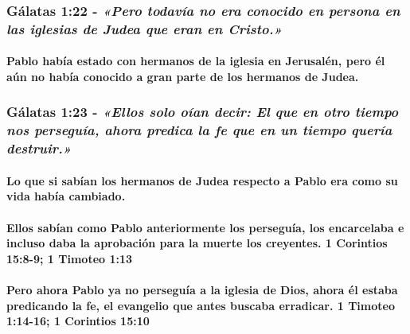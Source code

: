 \documentclass[11a pt,twoside]{article}
\newcommand{\scripture}[1]{%
  {\fontsize{12pt}{16pt}\selectfont\ScriptureFont\itshape #1}%
}
\let\oldsubsubsection\subsubsection
\renewcommand{\subsubsection}{\needspace{4\baselineskip}\oldsubsubsection}
\let\oldparagraph\paragraph
\renewcommand{\paragraph}{\needspace{3\baselineskip}\oldparagraph}
\begin{document}
\subsubsection{\texorpdfstring{Gálatas 1:22 -
\scripture{«Pero todavía no era conocido en persona en las iglesias de Judea que eran en Cristo.»}}{Gálatas 1:22 - }}\label{guxe1latas-122---pero-todavuxeda-no-era-conocido-en-persona-en-las-iglesias-de-judea-que-eran-en-cristo.}

\paragraph{Pablo había estado con hermanos de la iglesia en Jerusalén,
pero él aún no había conocido a gran parte de los hermanos de
Judea.}\label{pablo-habuxeda-estado-con-hermanos-de-la-iglesia-en-jerusaluxe9n-pero-uxe9l-auxfan-no-habuxeda-conocido-a-gran-parte-de-los-hermanos-de-judea.}

\subsubsection{\texorpdfstring{Gálatas 1:23 -
\scripture{«Ellos solo oían decir: El que en otro tiempo nos perseguía, ahora predica la fe que en un tiempo quería destruir.»}}{Gálatas 1:23 - }}\label{guxe1latas-123---ellos-solo-ouxedan-decir-el-que-en-otro-tiempo-nos-perseguuxeda-ahora-predica-la-fe-que-en-un-tiempo-queruxeda-destruir.}

\paragraph{Lo que si sabían los hermanos de Judea respecto a Pablo era
como su vida había
cambiado.}\label{lo-que-si-sabuxedan-los-hermanos-de-judea-respecto-a-pablo-era-como-su-vida-habuxeda-cambiado.}

\paragraph{Ellos sabían como Pablo anteriormente los perseguía, los
encarcelaba e incluso daba la aprobación para la muerte los creyentes. 1
Corintios 15:8-9; 1 Timoteo
1:13}\label{ellos-sabuxedan-como-pablo-anteriormente-los-perseguuxeda-los-encarcelaba-e-incluso-daba-la-aprobaciuxf3n-para-la-muerte-los-creyentes.-1-corintios-158-9-1-timoteo-113}

\paragraph{Pero ahora Pablo ya no perseguía a la iglesia de Dios, ahora
él estaba predicando la fe, el evangelio que antes buscaba erradicar. 1
Timoteo 1:14-16; 1 Corintios
15:10}\label{pero-ahora-pablo-ya-no-perseguuxeda-a-la-iglesia-de-dios-ahora-uxe9l-estaba-predicando-la-fe-el-evangelio-que-antes-buscaba-erradicar.-1-timoteo-114-16-1-corintios-1510}
\end{document}
